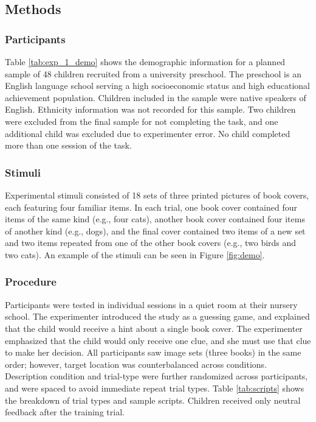 \documentclass[man]{apa2}
\begin{document}
\subsection{Methods}

\subsubsection{Participants}

Table \ref{tab:exp_1_demo} shows the demographic information for a planned sample of 48 children recruited from a university preschool. The preschool is an English language school serving a high socioeconomic status and high educational achievement population. Children included in the sample were native speakers of English. Ethnicity information was not recorded for this sample. Two children were excluded from the final sample for not completing the task, and one additional child was excluded due to experimenter error. No child completed more than one session of the task.


\subsubsection{Stimuli}

Experimental stimuli consisted of 18 sets of three printed pictures of book covers, each featuring four familiar items. In each trial, one book cover contained four items of the same kind (e.g., four cats), another book cover contained four items of another kind (e.g., dogs), and the final cover contained two items of a new set and two items repeated from one of the other book covers (e.g., two birds and two cats). An example of the stimuli can be seen in Figure \ref{fig:demo}. 

\subsubsection{Procedure}

Participants were tested in individual sessions in a quiet room at their nursery school. The experimenter introduced the study as a guessing game, and explained that the child would receive a hint about a single book cover. The experimenter emphasized that the child would only receive one clue, and she must use that clue to make her decision. All participants saw image sets (three books) in the same order; however, target location was counterbalanced across conditions. Description condition and trial-type were further randomized across participants, and were spaced to avoid immediate repeat trial types. Table \ref{tab:scripts} shows the breakdown of trial types and sample scripts. Children received only neutral feedback after the training trial.
\end{document}
